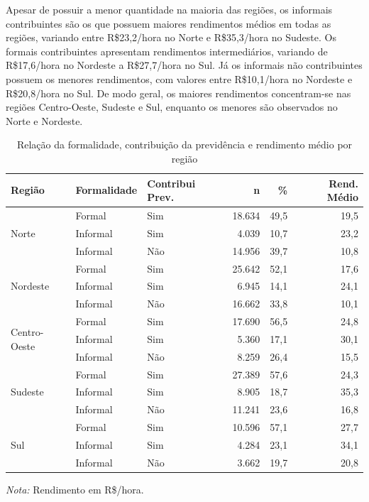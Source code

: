 \documentclass[12pt,a4paper,header]{abnt}
\begin{document}
Apesar de possuir a menor quantidade na maioria das regiões, os informais contribuintes são os que possuem maiores rendimentos médios em todas as regiões, variando entre R\$23,2/hora no Norte e R\$35,3/hora no Sudeste. Os formais contribuintes apresentam rendimentos intermediários, variando de R\$17,6/hora no Nordeste a R\$27,7/hora no Sul. Já os informais não contribuintes possuem os menores rendimentos, com valores entre R\$10,1/hora no Nordeste e R\$20,8/hora no Sul. De modo geral, os maiores rendimentos concentram-se nas regiões Centro-Oeste, Sudeste e Sul, enquanto os menores são observados no Norte e Nordeste.
\begin{table}[ht]
\centering
\caption{Relação da formalidade, contribuição da previdência e rendimento médio por região}
\label{tab:formalidade_prev_rend}
\begin{tabular}{lllrrr}
\toprule
\textbf{Região} & \textbf{Formalidade} & \textbf{Contribui Prev.} & \textbf{n} & \textbf{\%} & \textbf{Rend. Médio} \\
\midrule
\multirow{3}{*}{Norte} & Formal   & Sim & 18.634 & 49,5 & 19,5 \\
                       & Informal & Sim &  4.039 & 10,7 & 23,2 \\
                       & Informal & Não & 14.956 & 39,7 & 10,8 \\
\midrule
\multirow{3}{*}{Nordeste} & Formal   & Sim & 25.642 & 52,1 & 17,6 \\
                          & Informal & Sim &  6.945 & 14,1 & 24,1 \\
                          & Informal & Não & 16.662 & 33,8 & 10,1 \\
\midrule
\multirow{3}{*}{Centro-Oeste} & Formal   & Sim & 17.690 & 56,5 & 24,8 \\
                              & Informal & Sim &  5.360 & 17,1 & 30,1 \\
                              & Informal & Não &  8.259 & 26,4 & 15,5 \\
\midrule
\multirow{3}{*}{Sudeste} & Formal   & Sim & 27.389 & 57,6 & 24,3 \\
                         & Informal & Sim &  8.905 & 18,7 & 35,3 \\
                         & Informal & Não & 11.241 & 23,6 & 16,8 \\
\midrule
\multirow{3}{*}{Sul} & Formal   & Sim & 10.596 & 57,1 & 27,7 \\
                     & Informal & Sim &  4.284 & 23,1 & 34,1 \\
                     & Informal & Não &  3.662 & 19,7 & 20,8 \\
\bottomrule
\end{tabular}
\smallskip
\small
\textit{Nota:} Rendimento em R\$/hora.
\end{table}
\end{document}
